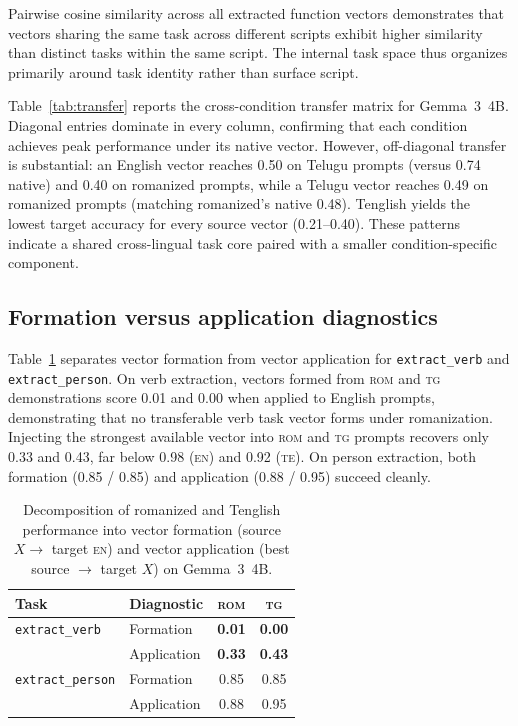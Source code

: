 \documentclass[11pt]{article}
\newcommand{\cond}[1]{\textsc{#1}}
\begin{document}
Pairwise cosine similarity across all extracted function vectors demonstrates
that vectors sharing the same task across different scripts exhibit higher
similarity than distinct tasks within the same script. The internal task space
thus organizes primarily around task identity rather than surface script.

Table~\ref{tab:transfer} reports the cross-condition transfer matrix for
Gemma~3~4B. Diagonal entries dominate in every column, confirming that each
condition achieves peak performance under its native vector. However,
off-diagonal transfer is substantial: an English vector reaches 0.50 on Telugu
prompts (versus 0.74 native) and 0.40 on romanized prompts, while a Telugu
vector reaches 0.49 on romanized prompts (matching romanized's native 0.48).
Tenglish yields the lowest target accuracy for every source vector
(0.21--0.40). These patterns indicate a shared cross-lingual task core paired
with a smaller condition-specific component.

\begin{table}[t]
\centering
\small
\caption{Cross-condition transfer matrix (Gemma~3~4B). Rows indicate the vector
  source condition; columns indicate the zero-shot target prompt condition.}
\label{tab:transfer}
\end{table}

\subsection{Formation versus application diagnostics}
\label{sec:formation}

Table~\ref{tab:form_app} separates vector formation from vector application for
\texttt{extract\_verb} and \texttt{extract\_person}. On verb extraction,
vectors formed from \cond{rom} and \cond{tg} demonstrations score 0.01 and 0.00
when applied to English prompts, demonstrating that no transferable verb task
vector forms under romanization. Injecting the strongest available vector into
\cond{rom} and \cond{tg} prompts recovers only 0.33 and 0.43, far below
0.98 (\cond{en}) and 0.92 (\cond{te}). On person extraction, both formation
(0.85 / 0.85) and application (0.88 / 0.95) succeed cleanly.

\begin{table}[t]
\centering
\small
\begin{tabular}{llcc}
\toprule
Task & Diagnostic & \cond{rom} & \cond{tg} \\
\midrule
\texttt{extract\_verb}   & Formation   & \textbf{0.01} & \textbf{0.00} \\
                         & Application & \textbf{0.33} & \textbf{0.43} \\
\midrule
\texttt{extract\_person} & Formation   & 0.85 & 0.85 \\
                         & Application & 0.88 & 0.95 \\
\bottomrule
\end{tabular}
\caption{Decomposition of romanized and Tenglish performance into vector
  formation (source $X \to$ target \cond{en}) and vector application (best
  source $\to$ target $X$) on Gemma~3~4B.}
\label{tab:form_app}
\end{table}
\end{document}
